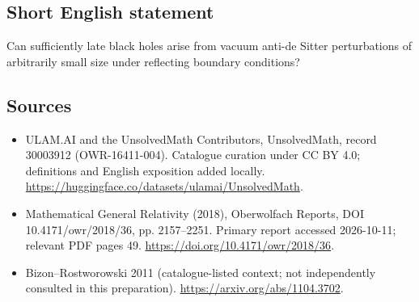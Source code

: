 \documentclass[11pt]{article}
\begin{document}
\subsection{Short English statement}
Can sufficiently late black holes arise from vacuum anti-de Sitter perturbations of arbitrarily small size under reflecting boundary conditions?
\subsection{Sources}
\begin{itemize}
\item[\hypertarget{source:30003912:1}{S1}] ULAM.AI and the UnsolvedMath Contributors, UnsolvedMath, record 30003912 (OWR-16411-004). Catalogue curation under CC BY 4.0; definitions and English exposition added locally.
\url{https://huggingface.co/datasets/ulamai/UnsolvedMath}.
\item[\hypertarget{source:30003912:2}{S2}] Mathematical General Relativity (2018), Oberwolfach Reports, DOI 10.4171/owr/2018/36, pp. 2157--2251. Primary report accessed 2026-10-11; relevant PDF pages 49.
\url{https://doi.org/10.4171/owr/2018/36}.
\item[\hypertarget{source:30003912:3}{S3}] Bizon--Rostworowski 2011 (catalogue-listed context; not independently consulted in this preparation).
\url{https://arxiv.org/abs/1104.3702}.
\end{itemize}
\label{end:30003912}
\end{document}
